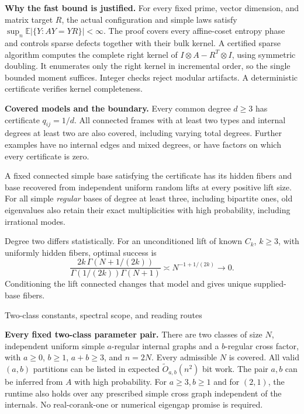 \documentclass[10pt]{article}
\newcommand{\E}{\mathbb E}
\begin{document}
\textbf{Why the fast bound is justified.}
For every fixed prime, vector dimension, and matrix target $R$,
the actual configuration and simple laws satisfy
$\sup_n\E|\{Y:AY=YR\}|<\infty$. The proof covers every affine-coset
entropy phase and controls sparse defects together with their bulk
kernel. A certified sparse algorithm computes the complete right
kernel of $I\otimes A-R^T\otimes I$, using symmetric doubling.
It enumerates only the right kernel in incremental order, so the
single bounded moment suffices. Integer checks reject modular artifacts.
A deterministic certificate verifies kernel completeness.

\textbf{Covered models and the boundary.}
Every common degree $d\ge3$ has certificate $q_{ij}=1/d$.
All connected frames with at least two types and internal degrees at least
two are also covered, including varying total degrees. Further examples have no internal edges
and mixed degrees, or have factors on which every certificate is zero.

A fixed connected simple base satisfying the certificate has its hidden
fibers and base recovered from independent uniform random lifts at every
positive lift size. For all simple \emph{regular} bases of degree at least
three, including bipartite ones, old eigenvalues also retain their exact
multiplicities with high probability, including irrational modes.

Degree two differs statistically. For an unconditioned lift of known
$C_k$, $k\ge3$, with uniformly hidden fibers, optimal success is
\[
 \frac{2k\,\Gamma(N+1/(2k))}
 {\Gamma(1/(2k))\Gamma(N+1)}
 \asymp N^{-1+1/(2k)}\longrightarrow0.
\]
Conditioning the lift connected changes that model and gives unique
supplied-base fibers.

\newpage
{\Large Two-class constants, spectral scope, and reading routes}

\textbf{Every fixed two-class parameter pair.}
There are two classes of size $N$, independent uniform simple
$a$-regular internal graphs and a $b$-regular cross factor, with
$a\ge0$, $b\ge1$, $a+b\ge3$, and $n=2N$. Every admissible $N$ is covered.
All valid $(a,b)$ partitions can be listed in expected
$\widetilde O_{a,b}(n^2)$ bit work. The pair $a,b$ can be inferred from $A$ with high probability.
For $a\ge3,b\ge1$ and for $(2,1)$, the runtime also holds over any prescribed
simple cross graph independent of the internals. No real-corank-one or numerical eigengap promise is required.
\end{document}
